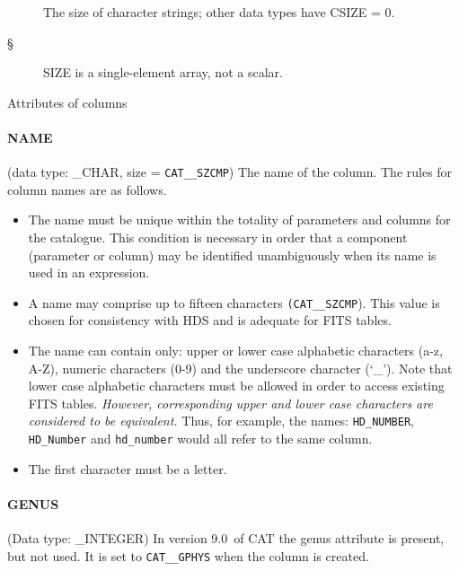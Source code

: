 \documentclass[11pt,twoside]{starlink}
\providecommand{\CATversion}{9.0~}
\begin{document}
\begin{table}[htbp]
\begin{description}

  \item[{\rm \dag}] The size of character strings; other data types
   have CSIZE = 0.

  \item[{\rm \S}] SIZE is a single-element array, not a scalar.

\end{description}

\caption{\label{CATTRIB}Attributes of columns}

\end{table}

\paragraph{NAME}
(data type: \_CHAR, size = \texttt{CAT\_\_SZCMP})
The name of the column. The rules for column names are as follows.

\begin{itemize}

  \item The name must be unique within the totality of parameters and
   columns for the catalogue. This condition is necessary in order that
   a component (parameter or column) may be identified unambiguously
   when its name is used in an expression.

  \item A name may comprise up to fifteen characters \texttt{(CAT\_\_SZCMP}). This value is chosen for consistency with HDS and
   is adequate for FITS tables.

  \item The name can contain only: upper or lower case alphabetic
   characters (a-z, A-Z), numeric characters (0-9) and the underscore
   character (`\_'). Note that lower case alphabetic characters must
   be allowed in order to access existing FITS tables. \textit{However,
   corresponding upper and lower case characters are considered to be
   equivalent.} Thus, for example, the names: \texttt{HD\_NUMBER}, \texttt{HD\_Number} and \texttt{hd\_number} would all refer to the same column.

  \item The first character must be a letter.

\end{itemize}

\paragraph{GENUS}
(Data type: \_INTEGER)
In version \CATversion of CAT the genus attribute is present, but not
used. It is set to \texttt{CAT\_\_GPHYS} when the column is created.
\end{document}
